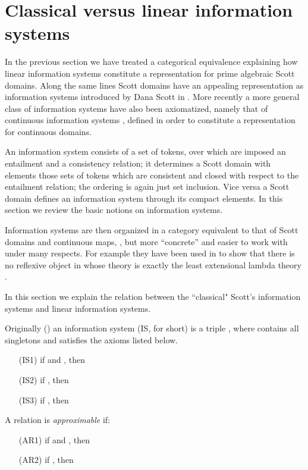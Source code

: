 \documentclass[copyright,creativecommons]{eptcs}
\begin{document}
\section{Classical versus linear information systems}

In the previous section we have treated a categorical equivalence explaining how linear information systems constitute a representation for prime algebraic Scott domains. Along the same lines Scott domains have an appealing representation as information systems introduced by Dana Scott in \cite{Scott82}. More recently \cite{Spreen08} a more general class of information systems have also been axiomatized, namely that of continuous information systems , defined in order to constitute a representation for continuous domains.

An information system consists of a set of tokens, over which are imposed an entailment and a consistency relation; it determines a Scott domain with elements those sets of tokens which are consistent and closed with respect to the entailment relation; the ordering is again just set inclusion. Vice versa a Scott domain defines an information system through its compact elements. In this section we review the basic notions on information systems.

Information systems are then organized in a category equivalent to that of Scott domains and continuous maps, , but more ``concrete'' and easier to work with under many respects. For example they have been used in \cite{Salibra09} to show that there is no reflexive object in  whose theory is exactly the least extensional lambda theory .

In this section we explain the relation between the ``classical" Scott's information systems and linear information systems.

\newpage

Originally (\cite{Scott82}) an information system (IS, for short) is a triple , where \mbox{} contains all singletons and  satisfies the axioms listed below.
\begin{itemize}
\item[(IS1)] if  and , then 
\item[(IS2)] if , then 
\item[(IS3)] if , then 
\end{itemize}

\medskip

A relation  is \emph{approximable} if:
\begin{itemize}
\item[(AR1)] if  and , then 
\item[(AR2)] if , then 
\end{itemize}
\end{document}
